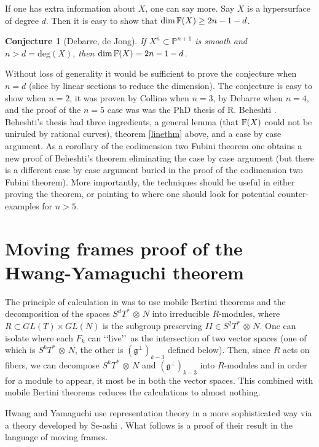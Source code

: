 \documentclass[11pt]{amsart}
\newtheorem{conjecture}[theorem]{Conjecture}
\theoremstyle{definition}
\theoremstyle{remark}
\numberwithin{equation}{section}
\def\pp#1{\mathbb P^{#1}}
\def\pp#1{{\mathbb P}^{#1}}
\def\tdim{\rm dim}
\def\upperp{{}^\perp}
\def\fg{{\mathfrak g}}
\def\ot{{\mathord{\,\otimes }\,}}
\def\tdeg{\text{deg} }
\def\tdim{\text{dim}\,}
\begin{document}
\medskip

If one has extra information about $X$, one can say more. Say
$X$ is a hypersurface of degree $d$. Then it is easy to
show that $\tdim \BF(X)\geq 2n-1-d$.

\begin{conjecture}[Debarre, de Jong] If $X^n\subset\pp{n+1}$ is smooth and
$n>d=\tdeg (X)$, then $\tdim \BF(X)= 2n-1-d$.
\end{conjecture}

Without loss of generality it would be sufficient to prove the
conjecture when $n=d$ (slice by linear sections to reduce the dimension).
The conjecture is easy to show when $n=2$, it was proven by
Collino when $n=3$, by Debarre when $n=4$, and the proof of the $n=5$ case
was  was the 
PhD thesis of R. Beheshti \cite{beheshti}. Beheshti's thesis had three
ingredients, a general lemma (that $\mathbb F(X)$ could not be uniruled by
rational curves), theorem \ref{linethm} above, and a case by case
argument. As a corollary of the codimension two Fubini theorem one
obtains a new proof of Beheshti's theorem eliminating the case
by case argument (but  there is a different case by case
argument buried in the proof of the codimension two Fubini theorem).
More importantly, the techniques should be useful in either proving
the theorem, or pointing to where one should look for potential
counter-examples for $n>5$.

\section{Moving frames proof of the Hwang-Yamaguchi theorem}\label{hysect}


The principle of calculation in \cite{Lchss}
was to use mobile Bertini theorems and the decomposition of the spaces $S^dT^*\ot N$ into irreducible $R$-modules, where 
$R\subset GL(T)\times GL(N)$ is the subgroup preserving
$II\in S^2T^*\ot N$. One can isolate where each $F_k$ can \lq\lq live\rq\rq\ as the
intersection of two vector spaces (one of which is $S^kT^*\ot N$, the other   is  $(\fg\upperp)_{k-3}$ defined below). Then, since $R$ acts on fibers, we can decompose
$S^kT^*\ot N$ and $(\fg\upperp)_{k-3}$ into $R$-modules and in order for a module to appear, it most be in both the vector
spaces. This combined with mobile Bertini theorems reduces the calculations to almost nothing.

  Hwang and Yamaguchi  use representation theory
in a more sophisticated way via
  a theory developed by Se-ashi \cite{seashi}. What follows is a proof of their result in the language of moving frames.
\end{document}
